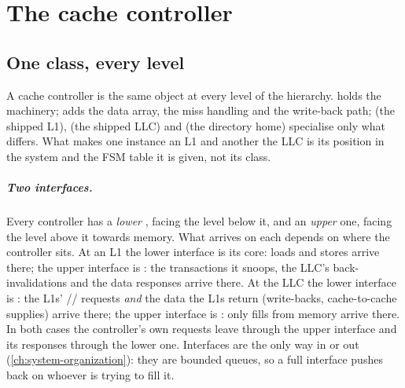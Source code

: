 \chapter{The cache controller}\label{ch:cache-controller}


\section{One class, every level}

A cache controller is the same object at every level of the hierarchy. 
holds the machinery;  adds the data array, the miss handling and the
write-back path;  (the shipped L1), 
(the shipped LLC) and  (the directory home) specialise only what
differs. What makes one instance an L1 and another the LLC is its position in the system and the
FSM table it is given, not its class.


\paragraph{Two interfaces.} Every controller has a \emph{lower} ,
facing the level below it, and an \emph{upper} one, facing the level above it towards memory.
What arrives on each depends on where the controller sits. At an L1 the lower interface is its
core: loads and stores arrive there; the upper interface is : the transactions it
snoops, the LLC's back-invalidations and the data responses arrive there. At the LLC the lower
interface is : the L1s' // requests \emph{and}
the data the L1s return (write-backs, cache-to-cache supplies) arrive there; the upper interface
is : only fills from memory arrive there. In both cases the controller's own
requests leave through the upper interface and its responses through the lower one. Interfaces
are the only way in or out (\cref{ch:system-organization}): they are bounded queues, so a full
interface pushes back on whoever is trying to fill it.

